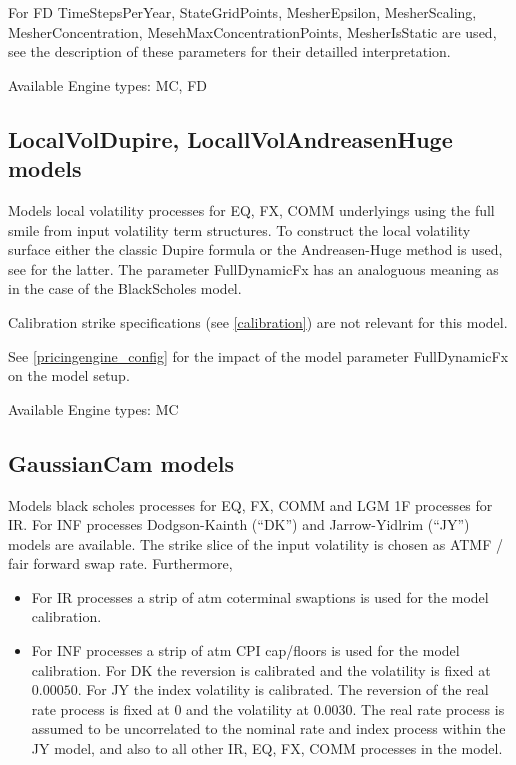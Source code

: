 For FD TimeStepsPerYear, StateGridPoints, MesherEpsilon, MesherScaling, MesherConcentration,
MesehMaxConcentrationPoints, MesherIsStatic are used, see the description of these parameters for their detailled
interpretation.

\smallskip
Available Engine types: MC, FD

\subsection{LocalVolDupire, LocallVolAndreasenHuge models}

Models local volatility processes for EQ, FX, COMM underlyings using the full smile from input volatility term
structures. To construct the local volatility surface either the classic Dupire formula or the Andreasen-Huge method is
used, see \cite{andreasen_huge_localvol} for the latter. The parameter FullDynamicFx has an analoguous meaning as in the
case of the BlackScholes model.

Calibration strike specifications (see \ref{calibration}) are not relevant for this model.

See \ref{pricingengine_config} for the impact of the model parameter FullDynamicFx on the model setup.

\smallskip
Available Engine types: MC

\subsection{GaussianCam models}

Models black scholes processes for EQ, FX, COMM and LGM 1F processes for IR. For INF processes Dodgson-Kainth (``DK'')
and Jarrow-Yidlrim (``JY'') models are available. The strike slice of the input volatility is chosen as ATMF / fair
forward swap rate. Furthermore,

\begin{itemize}
\item For IR processes a strip of atm coterminal swaptions is used for the model calibration.
\item For INF processes a strip of atm CPI cap/floors is used for the model calibration. For DK the reversion is
  calibrated and the volatility is fixed at $0.00050$. For JY the index volatility is calibrated. The reversion of the
  real rate process is fixed at $0$ and the volatility at $0.0030$. The real rate process is assumed to be uncorrelated
  to the nominal rate and index process within the JY model, and also to all other IR, EQ, FX, COMM processes in the
  model.
\end{itemize}

